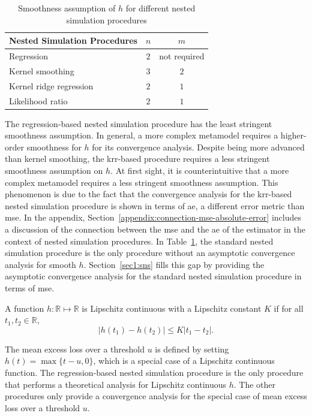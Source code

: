 \begin{table}[ht!]
    \centering
    \begin{tabular}{lcc}
    \toprule
    \textbf{Nested Simulation Procedures} & $n$ & $m$ \\
    \midrule
    Regression & $2$ & not required \\
    Kernel smoothing & $3$ & $2$ \\
    Kernel ridge regression & $2$ & $1$ \\
    Likelihood ratio & $2$ & $1$ \\
    \bottomrule
    \end{tabular}
    \caption{Smoothness assumption of $h$ for different nested simulation procedures}
\label{tab1:smoothness}
\end{table}

The regression-based nested simulation procedure has the least stringent smoothness assumption.
In general, a more complex metamodel requires a higher-order smoothness for $h$ for its convergence analysis.
Despite being more advanced than kernel smoothing, the \gls{krr}-based procedure requires a less stringent smoothness assumption on $h$.
At first sight, it is counterintuitive that a more complex metamodel requires a less stringent smoothness assumption.
This phenomenon is due to the fact that the convergence analysis for the \gls{krr}-based nested simulation procedure is shown in terms of \gls{ae}, a different error metric than \gls{mse}.
In the appendix, Section~\ref{appendix:connection-mse-absolute-error} includes a discussion of the connection between the \gls{mse} and the \gls{ae} of the estimator in the context of nested simulation procedures.
In Table~\ref{tab1:smoothness}, the standard nested simulation procedure is the only procedure without an asymptotic convergence analysis for smooth $h$.
Section~\ref{sec1:sns} fills this gap by providing the asymptotic convergence analysis for the standard nested simulation procedure in terms of \gls{mse}.

\begin{definition}\label{def1:lipschitz}
    A function $h: \mathbb{R} \mapsto \mathbb{R}$ is Lipschitz continuous with a Lipschitz constant $K$ if for all $t_1, t_2 \in \mathbb{R}$, 
    $$|h(t_1) - h(t_2)| \leq K|t_1 - t_2|.$$
\end{definition}

The mean excess loss over a threshold $u$ is defined by setting $h(t) = \max\{t - u, 0\}$, which is a special case of a Lipschitz continuous function.
The regression-based nested simulation procedure is the only procedure that performs a theoretical analysis for Lipschitz continuous $h$.
The other procedures only provide a convergence analysis for the special case of mean excess loss over a threshold $u$.

